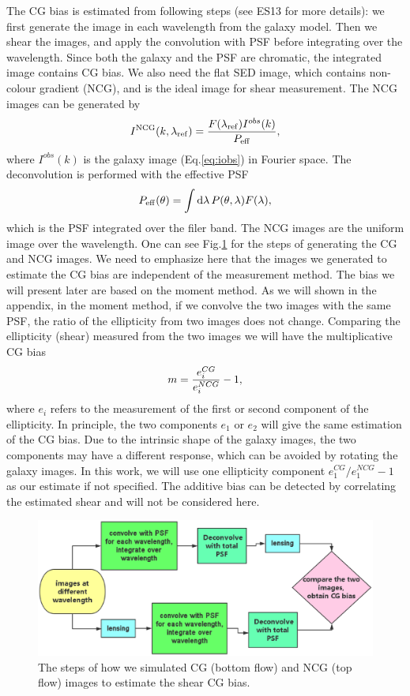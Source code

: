 \documentclass[useAMS,usenatbib]{mn2e}
\renewcommand{\d}{\mathrm{d}}
\newcommand{\be}{\begin{equation}}
\newcommand{\ee}{\end{equation}}
\begin{document}
The CG bias is estimated from following steps (see ES13 for more
details): we first generate the image in each wavelength from the
galaxy model. Then we shear the images, and apply the convolution with
PSF before integrating over the wavelength. Since both the galaxy and
the PSF are chromatic, the integrated image contains CG bias. We also
need the flat SED image, which contains non-colour gradient (NCG),
and is the ideal image for shear measurement. The NCG images can be
generated by
%
\be
I^{\rm NCG}(k, \lambda_{\rm ref}) = \dfrac{F(\lambda_{\rm ref}) I^{obs}(k)}
{P_{\rm eff}},
\ee
%
where $I^{obs}(k)$ is the galaxy image (Eq.\ref{eq:iobs}) in Fourier space.
The deconvolution is performed with the effective PSF
%
\be
P_{\rm eff}(\theta) = \int \d \lambda\, P(\theta,\lambda) F(\lambda),
\ee
%
which is the PSF integrated over the filer band.
The NCG images are the uniform image over the wavelength. One
can see Fig.\ref{fig:flowchart} for the steps of generating the CG and
NCG images. We need to emphasize here that the images we generated
to estimate the CG bias are independent of the measurement method.
The bias we will present later are based on the moment method. As we
will shown in the appendix, in the moment method, if we convolve the
two images with the same PSF, the ratio of the ellipticity from two
images does not change.
%
Comparing the ellipticity (shear) measured from the two images we will
have the multiplicative CG bias \citep{2006MNRAS.368.1323H}
%
\be
m= {e_i^{CG} \over e_i^{NCG} }-1,
\ee
%
where $e_i$ refers to the measurement of the first or second component
of the ellipticity. In principle, the two components $e_1$ or $e_2$
will give the same estimation of the CG bias. Due to the intrinsic
shape of the galaxy images, the two components may have a different
response, which can be avoided by rotating the galaxy images. 
In this work, we will use one
ellipticity component $e_1^{CG}/e_1^{NCG}-1$ as our estimate if not
specified. The additive bias can be detected by correlating the
estimated shear and will not be considered here.
%
\begin{figure}
\includegraphics[width=12.5cm]{colourg.eps}
\caption{The steps of how we simulated CG (bottom flow) and NCG (top
  flow) images to estimate the shear CG bias.}
\label{fig:flowchart}
\end{figure}
%
\end{document}

